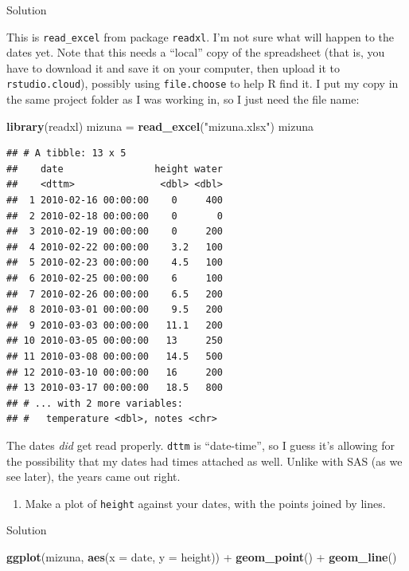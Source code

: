 \documentclass[]{tufte-book}
\newenvironment{Shaded}{}{}
\newcommand{\DataTypeTok}[1]{\textcolor[rgb]{0.56,0.13,0.00}{#1}}
\newcommand{\KeywordTok}[1]{\textcolor[rgb]{0.00,0.44,0.13}{\textbf{#1}}}
\newcommand{\NormalTok}[1]{#1}
\newcommand{\OperatorTok}[1]{\textcolor[rgb]{0.40,0.40,0.40}{#1}}
\newcommand{\StringTok}[1]{\textcolor[rgb]{0.25,0.44,0.63}{#1}}
\providecommand{\tightlist}{%
  \setlength{\itemsep}{0pt}\setlength{\parskip}{0pt}}
\theoremstyle{definition}
\theoremstyle{definition}
\theoremstyle{definition}
\theoremstyle{remark}
\begin{document}
Solution

This is \texttt{read\_excel} from package \texttt{readxl}. I'm not sure
what will happen to the dates yet. Note that this needs a ``local'' copy
of the spreadsheet (that is, you have to download it and save it on your
computer, then upload it to \texttt{rstudio.cloud}), possibly using
\texttt{file.choose} to help R find it. I put my copy in the same
project folder as I was working in, so I just need the file name:

\begin{Shaded}
\begin{Highlighting}[]
\KeywordTok{library}\NormalTok{(readxl)}
\NormalTok{mizuna =}\StringTok{ }\KeywordTok{read_excel}\NormalTok{(}\StringTok{"mizuna.xlsx"}\NormalTok{)}
\NormalTok{mizuna}
\end{Highlighting}
\end{Shaded}

\begin{verbatim}
## # A tibble: 13 x 5
##    date                height water
##    <dttm>               <dbl> <dbl>
##  1 2010-02-16 00:00:00    0     400
##  2 2010-02-18 00:00:00    0       0
##  3 2010-02-19 00:00:00    0     200
##  4 2010-02-22 00:00:00    3.2   100
##  5 2010-02-23 00:00:00    4.5   100
##  6 2010-02-25 00:00:00    6     100
##  7 2010-02-26 00:00:00    6.5   200
##  8 2010-03-01 00:00:00    9.5   200
##  9 2010-03-03 00:00:00   11.1   200
## 10 2010-03-05 00:00:00   13     250
## 11 2010-03-08 00:00:00   14.5   500
## 12 2010-03-10 00:00:00   16     200
## 13 2010-03-17 00:00:00   18.5   800
## # ... with 2 more variables:
## #   temperature <dbl>, notes <chr>
\end{verbatim}

The dates \emph{did} get read properly. \texttt{dttm} is ``date-time'',
so I guess it's allowing for the possibility that my dates had times
attached as well. Unlike with SAS (as we see later), the years came out
right.

\begin{enumerate}
\def\labelenumi{(\alph{enumi})}
\setcounter{enumi}{1}
\tightlist
\item
  Make a plot of \texttt{height} against your dates, with the points
  joined by lines.
\end{enumerate}

Solution

\begin{Shaded}
\begin{Highlighting}[]
\KeywordTok{ggplot}\NormalTok{(mizuna, }\KeywordTok{aes}\NormalTok{(}\DataTypeTok{x =}\NormalTok{ date, }\DataTypeTok{y =}\NormalTok{ height)) }\OperatorTok{+}\StringTok{ }\KeywordTok{geom_point}\NormalTok{() }\OperatorTok{+}\StringTok{ }
\StringTok{    }\KeywordTok{geom_line}\NormalTok{()}
\end{Highlighting}
\end{Shaded}
\end{document}
